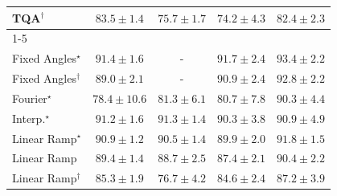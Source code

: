 \begin{tabular}{l|cccc|}
TQA$^\dagger$ & {\cellcolor[HTML]{1E8041}} \color[HTML]{F1F1F1} $83.5\pm 1.4$ & {\cellcolor[HTML]{53B466}} \color[HTML]{F1F1F1} $75.7\pm 1.7$ & {\cellcolor[HTML]{62BB6E}} \color[HTML]{F1F1F1} $74.2\pm 4.3$ & {\cellcolor[HTML]{258745}} \color[HTML]{F1F1F1} $82.4\pm 2.3$ \\
\cline{1-5}
\multicolumn{5}{c}{\rule{0pt}{8pt}SV} \\
\midrule
Fixed Angles$^\star$ & {\cellcolor[HTML]{03456C}} \color[HTML]{F1F1F1} $91.4\pm 1.6$ & {\cellcolor[HTML]{000000}} \color[HTML]{F1F1F1} {\cellcolor{white}} \color{black} - & {\cellcolor[HTML]{034369}} \color[HTML]{F1F1F1} $91.7\pm 2.4$ & {\cellcolor[HTML]{023858}} \color[HTML]{F1F1F1} $93.4\pm 2.2$ \\
Fixed Angles$^\dagger$ & {\cellcolor[HTML]{045483}} \color[HTML]{F1F1F1} $89.0\pm 2.1$ & {\cellcolor[HTML]{000000}} \color[HTML]{F1F1F1} {\cellcolor{white}} \color{black} - & {\cellcolor[HTML]{034871}} \color[HTML]{F1F1F1} $90.9\pm 2.4$ & {\cellcolor[HTML]{023B5D}} \color[HTML]{F1F1F1} $92.8\pm 2.2$ \\
Fourier$^\star$ & {\cellcolor[HTML]{2D8ABD}} \color[HTML]{F1F1F1} $78.4\pm 10.6$ & {\cellcolor[HTML]{1379B5}} \color[HTML]{F1F1F1} $81.3\pm 6.1$ & {\cellcolor[HTML]{187CB6}} \color[HTML]{F1F1F1} $80.7\pm 7.8$ & {\cellcolor[HTML]{034B76}} \color[HTML]{F1F1F1} $90.3\pm 4.4$ \\
Interp.$^\star$ & {\cellcolor[HTML]{03466E}} \color[HTML]{F1F1F1} $91.2\pm 1.6$ & {\cellcolor[HTML]{03456C}} \color[HTML]{F1F1F1} $91.3\pm 1.4$ & {\cellcolor[HTML]{034B76}} \color[HTML]{F1F1F1} $90.3\pm 3.8$ & {\cellcolor[HTML]{034871}} \color[HTML]{F1F1F1} $90.9\pm 4.9$ \\
Linear Ramp$^\star$ & {\cellcolor[HTML]{034871}} \color[HTML]{F1F1F1} $90.9\pm 1.2$ & {\cellcolor[HTML]{034A74}} \color[HTML]{F1F1F1} $90.5\pm 1.4$ & {\cellcolor[HTML]{034E7B}} \color[HTML]{F1F1F1} $89.9\pm 2.0$ & {\cellcolor[HTML]{034267}} \color[HTML]{F1F1F1} $91.8\pm 1.5$ \\
Linear Ramp & {\cellcolor[HTML]{045280}} \color[HTML]{F1F1F1} $89.4\pm 1.4$ & {\cellcolor[HTML]{045687}} \color[HTML]{F1F1F1} $88.7\pm 2.5$ & {\cellcolor[HTML]{045D92}} \color[HTML]{F1F1F1} $87.4\pm 2.1$ & {\cellcolor[HTML]{034B76}} \color[HTML]{F1F1F1} $90.4\pm 2.2$ \\
Linear Ramp$^\dagger$ & {\cellcolor[HTML]{05659F}} \color[HTML]{F1F1F1} $85.3\pm 1.9$ & {\cellcolor[HTML]{3F93C2}} \color[HTML]{F1F1F1} $76.7\pm 4.2$ & {\cellcolor[HTML]{0569A4}} \color[HTML]{F1F1F1} $84.6\pm 2.4$ & {\cellcolor[HTML]{045E93}} \color[HTML]{F1F1F1} $87.2\pm 3.9$ \\

\end{tabular}
